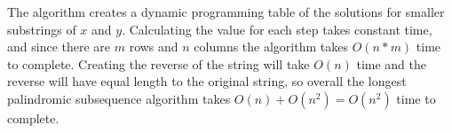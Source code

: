 \documentclass{article}
\begin{document}
The algorithm creates a dynamic programming table of the solutions for smaller substrings of $x$ and $y$. Calculating the value for each step takes constant time, and since there are $m$ rows and $n$ columns the algorithm takes $O(n*m)$ time to complete. Creating the reverse of the string will take $O(n)$ time and the reverse will have equal length to the original string, so overall the longest palindromic subsequence algorithm takes $O(n) + O(n^2) = O(n^2)$ time to complete.


\end{document}
